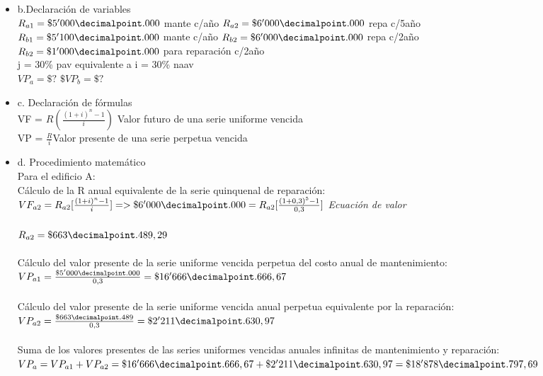 \begin{itemize}
	\item b.Declaración de variables\\
	$R_{a1} = \$5'000\decimalpoint.000$ mante c/año $R_{a2} = \$6'000\decimalpoint.000$ repa c/5año\\
	$R_{b1} = \$5'100\decimalpoint.000$ mante c/año $R_{b2} = \$6'000\decimalpoint.000$ repa c/2año\\
	$R_{b2} = \$1'000\decimalpoint.000$ para reparación c/2año\\
	j = 30\% pav equivalente a i = 30\% naav\\
	$VP_{a} = \$?$ $\$VP_{b} = \$?$\\
	
	\item c. Declaración de fórmulas\\
	VF = $R(\frac{(1+i)^n-1}{i})$ Valor futuro de una serie uniforme vencida\\
	
	VP = $\frac{R}{i}$Valor presente de una serie perpetua vencida\\
	
	\item d. Procedimiento matemático\\
	Para el edificio A:\\
	Cálculo de la R anual equivalente de la serie quinquenal de reparación: \\
	$VF_{a2} = R_{a2}[\frac{(1+i)^n-1}{i}] => \$6'000\decimalpoint.000 = R_{a2}[\frac{(1+0,3)^5-1}{0,3}]$ \hspace{35 pt} \textit{Ecuación de valor}\\ \\
	$R_{a2} = \$663\decimalpoint.489,29$\\ \\
	Cálculo del valor presente de la serie uniforme vencida perpetua del costo anual de mantenimiento: \\
	$VP_{a1} = \frac{\$5'000\decimalpoint.000}{0,3} = \$16'666\decimalpoint.666,67$\\ \\
	Cálculo del valor presente de la serie uniforme vencida anual perpetua equivalente por la reparación: \\
	$VP_{a2} = \frac{\$663\decimalpoint.489}{0,3} = \$2'211\decimalpoint.630,97$\\ \\
	
	Suma de los valores presentes de las series uniformes vencidas anuales infinitas de mantenimiento y reparación:\\
	$VP_{a} = VP_{a1} + VP_{a2} = \$16'666\decimalpoint.666,67 + \$2'211\decimalpoint.630,97 = \$18'878\decimalpoint.797,69$\\
	

\end{itemize}
